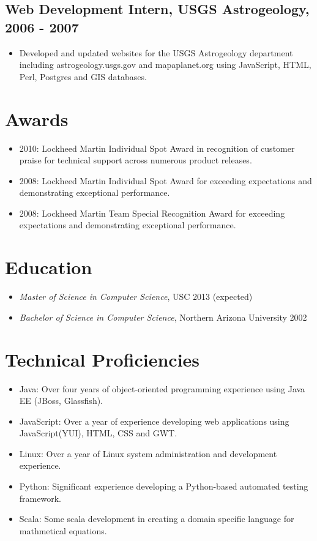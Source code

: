 \documentclass[11pt]{article}
\begin{document}
\subsection*{Web Development Intern, USGS Astrogeology, 2006 - 2007}
\label{sec-1.2}

\begin{itemize}
\item Developed and updated websites for the USGS Astrogeology department including astrogeology.usgs.gov and mapaplanet.org using JavaScript, HTML, Perl, Postgres and GIS databases.
\end{itemize}
\section*{Awards}
\label{sec-2}

\begin{itemize}
\item 2010: Lockheed Martin Individual Spot Award in recognition of customer praise for technical support across numerous product releases.
\item 2008: Lockheed Martin Individual Spot Award for exceeding expectations and demonstrating exceptional performance.
\item 2008: Lockheed Martin Team Special Recognition Award for exceeding expectations and demonstrating exceptional performance.
\end{itemize}
\section*{Education}
\label{sec-3}

\begin{itemize}
\item \emph{Master of Science in Computer Science}, USC 2013 (expected)
\item \emph{Bachelor of Science in Computer Science}, Northern Arizona University 2002
\end{itemize}
\section*{Technical Proficiencies}
\label{sec-4}

\begin{itemize}
\item Java: Over four years of object-oriented programming experience using Java EE (JBoss, Glassfish).
\item JavaScript: Over a year of experience developing web applications using JavaScript(YUI), HTML, CSS and GWT.
\item Linux: Over a year of Linux system administration and development experience.
\item Python: Significant experience developing a Python-based automated testing framework.
\item Scala: Some scala development in creating a domain specific language for mathmetical equations.
\end{itemize}
\end{document}
